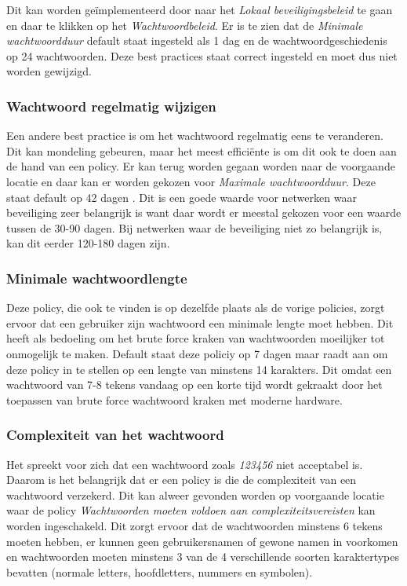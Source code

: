 \documentclass[pdftex,a4paper,12pt]{report}
\begin{document}
Dit kan worden geïmplementeerd door naar het \textit{Lokaal beveiligingsbeleid} te gaan en daar te klikken op het \textit{Wachtwoordbeleid}. Er is te zien dat de \textit{Minimale wachtwoordduur} default staat ingesteld als 1 dag en de wachtwoordgeschiedenis op 24 wachtwoorden. Deze best practices staat correct ingesteld en moet dus niet worden gewijzigd.

\subsubsection{Wachtwoord regelmatig wijzigen}
Een andere best practice is om het wachtwoord regelmatig eens te veranderen. Dit kan mondeling gebeuren, maar het meest efficiënte is om dit ook te doen aan de hand van een policy. Er kan terug worden gegaan worden naar de voorgaande locatie en daar kan er worden gekozen voor \textit{Maximale wachtwoordduur}. Deze staat default op 42 dagen . Dit is een goede waarde voor netwerken waar beveiliging zeer belangrijk is want daar wordt er meestal gekozen voor een waarde tussen de 30-90 dagen. Bij netwerken waar de beveiliging niet zo belangrijk is, kan dit eerder 120-180 dagen zijn. \citep{Stanek2009}

\subsubsection{Minimale wachtwoordlengte}
Deze policy, die ook te vinden is op dezelfde plaats als de vorige policies, zorgt ervoor dat een gebruiker zijn wachtwoord een minimale lengte moet hebben. Dit heeft als bedoeling om het brute force kraken van wachtwoorden moeilijker tot onmogelijk te maken. Default staat deze policiy op 7 dagen maar \cite{Stanek2009} raadt aan om deze policy in te stellen op een lengte van minstens 14 karakters. Dit omdat een wachtwoord van 7-8 tekens vandaag op een korte tijd wordt gekraakt door het toepassen van brute force wachtwoord kraken met moderne hardware.

\subsubsection{Complexiteit van het wachtwoord}
Het spreekt voor zich dat een wachtwoord zoals \textit{123456} niet acceptabel is. Daarom is het belangrijk dat er een policy is die de complexiteit van een wachtwoord verzekerd. Dit kan alweer gevonden worden op voorgaande locatie waar de policy \textit{Wachtwoorden moeten voldoen aan complexiteitsvereisten} kan worden ingeschakeld. Dit zorgt ervoor dat de wachtwoorden minstens 6 tekens moeten hebben, er kunnen geen gebruikersnamen of gewone namen in voorkomen en wachtwoorden moeten minstens 3 van de 4 verschillende soorten karaktertypes bevatten (normale letters, hoofdletters, nummers en symbolen). \citep{Stanek2009}
\end{document}
